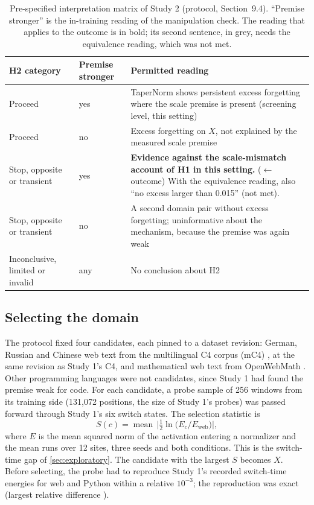 \documentclass[11pt]{article}
\begin{document}
\begin{table}[t]
\centering
\small
\caption{Pre-specified interpretation matrix of Study 2 (protocol, Section~9.4). ``Premise stronger'' is the
in-training reading of the manipulation check. The reading that applies to the outcome is in bold; its second
sentence, in grey, needs the equivalence reading, which was not met.}
\label{tab:s2matrix}
\begin{tabular}{@{}llp{8.2cm}@{}}
\toprule
H2 category & Premise stronger & Permitted reading \\
\midrule
Proceed & yes & TaperNorm shows persistent excess forgetting where the scale premise is present (screening level,
this setting) \\
Proceed & no & Excess forgetting on $X$, not explained by the measured scale premise \\
Stop, opposite or transient & yes & \textbf{Evidence against the scale-mismatch account of H1 in this setting.}
($\leftarrow$ outcome) \textcolor{black!45}{With the equivalence reading, also ``no excess larger than
0.015'' (not met).} \\
Stop, opposite or transient & no & A second domain pair without excess forgetting; uninformative about the
mechanism, because the premise was again weak \\
Inconclusive, limited or invalid & any & No conclusion about H2 \\
\bottomrule
\end{tabular}
\end{table}

\subsection{Selecting the domain}
\label{sec:s2selection}

The protocol fixed four candidates, each pinned to a dataset revision: German, Russian and Chinese web text from
the multilingual C4 corpus (mC4) \citep{xue2021mt5}, at the same revision as Study 1's C4, and mathematical web
text from OpenWebMath \citep{paster2024openwebmath}. Other programming languages were not candidates, since
Study 1 had found the premise weak for code. For each candidate, a probe sample of 256 windows from its training
side (131{,}072 positions, the size of Study 1's probes) was passed forward through Study 1's six switch states.
The selection statistic is
\begin{equation}
  S(c) = \operatorname{mean}\, \Big| \tfrac12 \ln \big( E_c / E_{\text{web}} \big) \Big| ,
\end{equation}
where $E$ is the mean squared norm of the activation entering a normalizer and the mean runs over 12 sites, three
seeds and both conditions. This is the switch-time gap of \cref{sec:exploratory}. The candidate with the largest
$S$ becomes $X$. Before selecting, the probe had to reproduce Study 1's recorded switch-time energies for web and
Python within a relative $10^{-3}$; the reproduction was exact (largest relative difference \twoReproMax).
\end{document}
